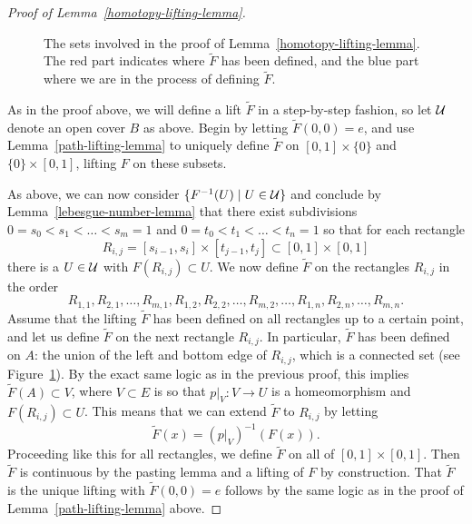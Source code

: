 \begin{proof}[Proof of Lemma~\ref{homotopy-lifting-lemma}]
  \begin{figure}
    \centering
    \caption{The sets involved in the proof of Lemma~\ref{homotopy-lifting-lemma}. The red part indicates where $\tilde{F}$ has been defined, and the blue part where we are in the process of defining $\tilde{F}$.}
    \label{homotopy-lifting-figure}
  \end{figure}
  As in the proof above, we will define a lift $\tilde{F}$ in a step-by-step fashion, so let $\mathcal{U}$ denote an open cover $B$ as above. Begin by letting $\tilde{F}(0,0) = e$, and use Lemma~\ref{path-lifting-lemma} to uniquely define $\tilde{F}$ on $[0,1] \times \{0\}$ and $\{0\} \times [0,1]$, lifting $F$ on these subsets.
  
  As above, we can now consider $\{F^{-1}(U) \mid U \in \mathcal{U}\}$ and conclude by Lemma~\ref{lebesgue-number-lemma} that there exist subdivisions $0 = s_0 < s_1 < \dots < s_m = 1$ and $0 = t_0 < t_1 < \dots < t_n = 1$ so that for each rectangle
  \[
    R_{i,j} = [s_{i-1},s_i] \times [t_{j-1},t_j] \subset [0,1] \times [0,1]
  \]
  there is a $U \in \mathcal{U}$ with $F(R_{i,j}) \subset U$. We now define $\tilde{F}$ on the rectangles $R_{i,j}$ in the order
  \[
    R_{1,1}, R_{2,1}, \dots, R_{m,1}, R_{1,2}, R_{2,2}, \dots, R_{m,2}, \dots, R_{1,n}, R_{2,n}, \dots, R_{m,n}.
  \]
  Assume that the lifting $\tilde{F}$ has been defined on all rectangles up to a certain point, and let us define $\tilde{F}$ on the next rectangle $R_{i,j}$. In particular, $\tilde{F}$ has been defined on $A$: the union of the left and bottom edge of $R_{i,j}$, which is a connected set (see Figure~\ref{homotopy-lifting-figure}). By the exact same logic as in the previous proof, this implies $\tilde{F}(A) \subset V$, where $V \subset E$ is so that $p|_V : V \to U$ is a homeomorphism and $F(R_{i,j}) \subset U$. This means that we can extend $\tilde{F}$ to $R_{i,j}$ by letting
  \[
    \tilde{F}(x) = (p|_V)^{-1}(F(x)).
  \]
  Proceeding like this for all rectangles, we define $\tilde{F}$ on all of $[0,1] \times [0,1]$. Then $\tilde{F}$ is continuous by the pasting lemma and a lifting of $F$ by construction. That $\tilde{F}$ is the unique lifting with $\tilde{F}(0,0) = e$ follows by the same logic as in the proof of Lemma~\ref{path-lifting-lemma} above.
  

\end{proof}
